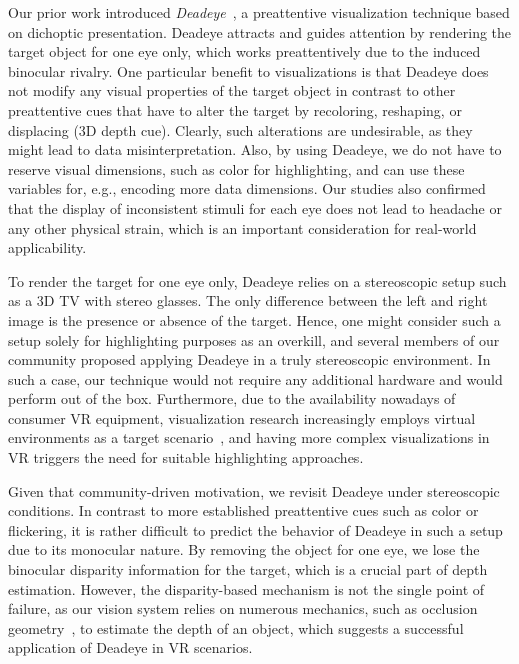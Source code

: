 \documentclass[journal]{vgtc}                %
\begin{document}
Our prior work introduced \textit{Deadeye}~\cite{krekhov2019deadeye}, a preattentive visualization technique based on dichoptic presentation. Deadeye attracts and guides attention by rendering the target object for one eye only, which works preattentively due to the induced binocular rivalry. One particular benefit to visualizations is that Deadeye does not modify any visual properties of the target object in contrast to other preattentive cues that have to alter the target by recoloring, reshaping, or displacing (3D depth cue). Clearly, such alterations are undesirable, as they might lead to data misinterpretation. Also, by using Deadeye, we do not have to reserve visual dimensions, such as color for highlighting, and can use these variables for, e.g., encoding more data dimensions. Our studies also confirmed that the display of inconsistent stimuli for each eye does not lead to headache or any other physical strain, which is an important consideration for real-world applicability.


To render the target for one eye only, Deadeye relies on a stereoscopic setup such as a 3D TV with stereo glasses. The only difference between the left and right image is the presence or absence of the target. Hence, one might consider such a setup solely for highlighting purposes as an overkill, and several members of our community proposed applying Deadeye in a truly stereoscopic environment. In such a case, our technique would not require any additional hardware and would perform out of the box. Furthermore, due to the availability nowadays of consumer VR equipment, visualization research increasingly employs virtual environments as a target scenario~\cite{kratz2006gpu,shen2008medvis,laha2012effects,hanel2016visual,scholl,milan2018extending}, and having more complex visualizations in VR triggers the need for suitable highlighting approaches.

Given that community-driven motivation, we revisit Deadeye under stereoscopic conditions. In contrast to more established preattentive cues such as color or flickering, it is rather difficult to predict the behavior of Deadeye in such a setup due to its monocular nature. By removing the object for one eye, we lose the binocular disparity information for the target, which is a crucial part of depth estimation. However, the disparity-based mechanism is not the single point of failure, as our vision system relies on numerous mechanics, such as occlusion geometry~\cite{tsirlin2012vinci}, to estimate the depth of an object, which suggests a successful application of Deadeye in VR scenarios.
\end{document}
